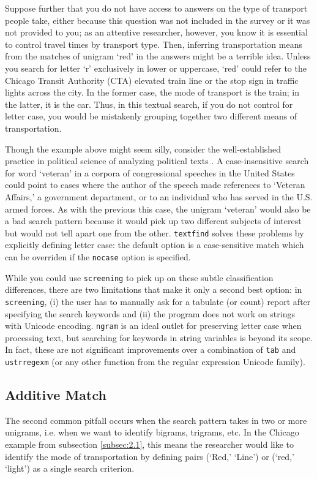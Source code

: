 Suppose further that you do not have access to answers on the type of transport people take, either because this question was not included in the survey or it was not provided to you; as an attentive researcher, however, you know it is essential to control travel times by transport type. Then, inferring transportation means from the matches of unigram `red' in the answers might be a terrible idea. Unless you search for letter `r' exclusively in lower or uppercase, `red' could refer to the Chicago Transit Authority (CTA) elevated train line or the stop sign in traffic lights across the city. In the former case, the mode of transport is the train; in the latter, it is the car. Thus, in this textual search, if you do not control for letter case, you would be mistakenly grouping together two different means of transportation.

Though the example above might seem silly, consider the well-established practice in political science of analyzing political texts \citep{GrimmerTextDataPromise2013a}. A case-insensitive search for word `veteran' in a corpora of congressional speeches in the United States could point to cases where the author of the speech made references to `Veteran Affairs,' a government department, or to an individual who has served in the U.S. armed forces. As with the previous this case, the unigram `veteran' would also be a bad search pattern because it would pick up two different subjects of interest but would not tell apart one from the other. {\tt textfind} solves these problems by explicitly defining letter case: the default option is a case-sensitive match which can be overriden if the {\tt nocase} option is specified.

While you could use {\tt screening} to pick up on these subtle classification differences, there are two limitations that make it only a second best option: in {\tt screening}, (i) the user has to manually ask for a tabulate (or count) report after specifying the search keywords and (ii) the program does not work on strings with Unicode encoding. {\tt ngram} is an ideal outlet for preserving letter case when processing text, but searching for keywords in string variables is beyond its scope. In fact, these are not significant improvements over a combination of {\tt tab} and {\tt ustrregexm} (or any other function from the regular expression Unicode family).

\subsection[Additive]{Additive Match}
The second common pitfall occurs when the search pattern takes in two or more unigrams, i.e. when we want to identify bigrams, trigrams, etc. In the Chicago example from subsection \ref{subsec:2.1}, this means the researcher would like to identify the mode of transportation by defining pairs (`Red,' `Line') or (`red,' `light') as a single search criterion.

